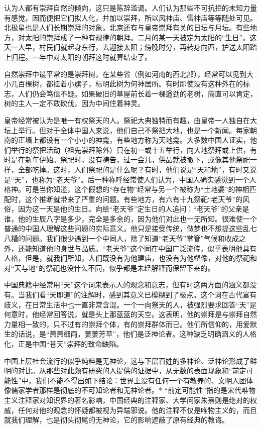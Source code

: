 \documentclass[12pt,oneside]{book}
\begin{document}
\begin{common-format}
认为人都有崇拜自然的倾向，这只是陈辞滥调。人们认为那些不可抗拒的未知力量有感觉，因而便把它们拟人化，并加以崇拜，所以风神庙、雷神庙等等随处可见。北极星也是人们长期崇拜的对象。北京还有与皇帝崇拜有关的日坛与月坛。有些地方，对太阳的崇拜成了一种有规律的朝拜。二月的某一天被定为太阳的“生日”。这天一大早，村民们就起身东行，去迎接太阳；傍晚时分，再转身向西，护送太阳踏上归程。一年中对太阳的朝拜这时就算结束了。 

自然崇拜中最平常的是崇拜树，在某些省（例如河南的西北部），经常可以见到大小几百棵树，都挂着小旗子，标明此树为何神居所。有时即使没有这种外在的标志，人们仍会笃信不疑。如果破旧的草屋前长着一棵遒劲的老树，简直可以肯定，树的主人一定不敢砍伐，因为中间住着神灵。 

皇帝经常被认为是唯一有权祭天的人。祭祀大典独特而有趣，由皇帝一人独自在大坛上举行。但对于全体中国人来说，他们自己不祭把大地，也是一个新闻。每家朝南的正墙上都设有一个小小的神龛，有些地方称为天地龛。大多数中国人证实，他们举行的祭把活动（祖先崇拜除外）只在初一或十五举行，向大地祭拜或上供，有时是在新年伊始。祭祀时，没有祷告，过一会儿，供品就被撤下，或像其他祭祀一样，全部吃掉。这时，人们祭祀的是什么呢？有时，他们说是“天和地”，有时又说是“天”，也称为“老天爷”。后一种称呼经常使人们认为，中国人确实感觉到一个人格神。可是当你知道，这个假想的“存在物”经常与另一个被称为“土地婆”的神相匹配时，这个推断就带来了严重的问题。有些地方，有六有十九祭祀“老天爷”的风俗，因为这一天是他的生日。向给“老天爷”定生日的人追问：“老天爷”的父亲是谁，他的生辰八字是多少，完全是多余的，因为他们对此也一无所知。很难使一个普通的中国人理解这些问题的实际意义。他只是接受传统，做梦也不想提这些乱七八糟的问题。我们很少遇到一个中同人，除了知道“老天爷”掌管”气候和收成之外，还能知道他的身世与品质。“老天爷”这个同在中国广泛流传，似乎表明他具有人格，但是，就我们所知，人们既没有为他建庙，也没有为他塑像，对他的祭祀和对“天与地”的祭祀也没什么不同，似乎都是未经解释而保留下来的。 

中国典籍中经常用“天”这个词来表示人的观念和意志，但有时这两方面的涵义都没有。当我们看“天即道”的注解时，感到其意义已模糊到了极点。这个词在古代富有歧义，在日常生活中也一直非常含混。一个一向祭天的人，被强烈要求回答“天”是何意时，他经常回答说，就是头上那蓝蓝的天空。这表明，他的崇拜是与崇拜自然力量相一致的，只不过有的崇拜个体，有的崇拜群体而已。他们所信仰的，用爱默生的话说，是“萧萧细雨，萋萋芳草”，他们是泛神论者。这种缺乏明确涵义的人格化，正是中国“苍天”崇拜的致命缺陷。 

中国上层社会流行的似乎纯粹是无神论，这与下层百姓的多神论、泛神论形成了鲜明的对比。从那些对此颇有研究的人提供的证据中，从无数的表面现象和“前定可能性”中，我们不能不得出如下结论：世界上没有任何一个有教养的、文明人团体像儒家学者那样是彻底的不可知论者和无神论者。* “前定可能性”指的是宋代唯物主义注释家对知识界的著名影响，中国经典的注释家、大学问家朱熹则是绝对的权威，任何对他的观念的怀疑都被视为异端邪说。他的注释不仅是唯物主义的，而且就我们理解，也是彻头彻尾的无神论，它的影响遮蔽了原有经典的教诲。 


\end{common-format}
\end{document}
